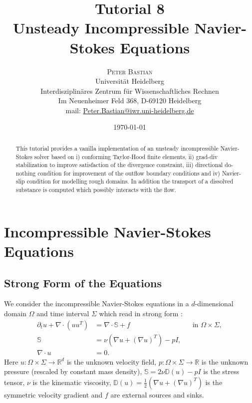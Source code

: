 \documentclass[a4paper,12pt]{article}
\title{Tutorial 8\\ Unsteady Incompressible Navier-Stokes Equations}
\author{\textsc{Peter Bastian}\\
  Universität Heidelberg\\
  Interdisziplinäres Zentrum für Wissenschaftliches Rechnen\\
  Im Neuenheimer Feld 368, D-69120 Heidelberg\\
mail: \url{Peter.Bastian@iwr.uni-heidelberg.de}
}
\date{\today}
\theoremstyle{definition}
\begin{document}
\maketitle

\begin{abstract}
This tutorial provides a vanilla implementation of an unsteady incompressible Navier-Stokes
solver based on i) conforming Taylor-Hood finite elements, ii) grad-div stabilization to
improve satisfaction of the divergence constraint, iii) directional do-nothing condition
for improvement of the outflow boundary conditions and iv) Navier-slip condition for
modelling rough domains. In addition the transport of a dissolved
substance is computed which possibly interacts with the flow.
\end{abstract}

\tableofcontents

\newpage

\section{Incompressible Navier-Stokes Equations}

\subsection{Strong Form of the Equations}

We consider the incompressible Navier-Stokes equations in a $d$-dimensional domain $\Omega$ and time
interval $\Sigma$ which read in strong form \cite{JohnLectureNotes}:
\begin{subequations}
\begin{align}
\partial_t u + \nabla\cdot(u u^T)  &= \nabla \cdot \mathbb{S} + f &&\text{in $\Omega\times\Sigma$},\\
\mathbb{S} &= \nu \left( \nabla u + (\nabla u)^T \right) - pI,\\
\nabla\cdot u &= 0 .
\end{align}
\end{subequations}
Here $u:\Omega\times\Sigma\to\mathbb{R}^d$ is the unknown velocity field, 
$p:\Omega\times\Sigma\to\mathbb{R}$ is the unknown pressure (rescaled by constant mass density),
$\mathbb{S} = 2\nu\mathbb{D}(u)-pI$ is the stress tensor, $\nu$ is the kinematic viscosity,
$\mathbb{D}(u)=\frac12 \left( \nabla u + (\nabla u)^T \right)$ is the
symmetric velocity gradient and $f$ are external sources and sinks.
\end{document}
